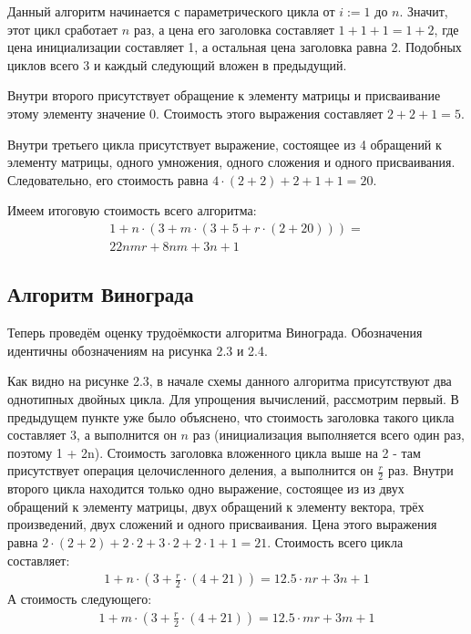 Данный алгоритм начинается с параметрического цикла от $i := 1$ до $n$. Значит, этот цикл сработает $n$ раз, а цена его заголовка составляет $1 + 1 + 1 = 1 + 2$, где цена инициализации составляет 1, а остальная цена заголовка равна 2. Подобных циклов всего 3 и каждый следующий вложен в предыдущий.

Внутри второго присутствует обращение к элементу матрицы и присваивание этому элементу значение 0. Стоимость этого выражения составляет $2 + 2 + 1 = 5$.

Внутри третьего цикла присутствует выражение, состоящее из 4 обращений к элементу матрицы, одного умножения, одного сложения и одного присваивания. Следовательно, его стоимость равна $4\cdot{}(2 + 2) + 2 + 1 + 1 = 20$.

Имеем итоговую стоимость всего алгоритма:
\begin{equation}
    \begin{gathered}
    1 + n \cdot{} (3 + m \cdot{} (3 + 5 + r \cdot{} (2 + 20))) =\\
    22nmr + 8nm + 3n + 1
    \end{gathered}
\end{equation}

\subsection{Алгоритм Винограда}
Теперь проведём оценку трудоёмкости алгоритма Винограда. Обозначения идентичны обозначениям на рисунка 2.3 и 2.4.

Как видно на рисунке 2.3, в начале схемы данного алгоритма присутствуют два однотипных двойных цикла. Для упрощения вычислений, рассмотрим  первый. В предыдущем пункте уже было объяснено, что стоимость заголовка такого цикла составляет 3, а выполнится он $n$ раз (инициализация выполняется всего один раз, поэтому 1 + 2n). Стоимость заголовка вложенного цикла выше на 2 - там присутствует операция целочисленного деления, а выполнится он $\frac{r}{2}$ раз. Внутри второго цикла находится только одно выражение, состоящее из из двух обращений к элементу матрицы, двух обращений к элементу вектора, трёх произведений, двух сложений и одного присваивания. Цена этого выражения равна $2\cdot{}(2 + 2) + 2\cdot{}2 + 3\cdot{}2 + 2\cdot{}1 + 1 = 21$. Стоимость всего цикла составляет:
\begin{equation}
    \begin{gathered}
        1 + n\cdot{}(3 + \frac{r}{2}\cdot{}(4 + 21)) = 12.5\cdot{}nr + 3n + 1
    \end{gathered}
\end{equation}
А стоимость следующего:
\begin{equation}
    \begin{split}
        1 + m\cdot{}(3 + \frac{r}{2}\cdot{}(4 + 21)) = 12.5\cdot{}mr + 3m + 1
    \end{split}
\end{equation}

